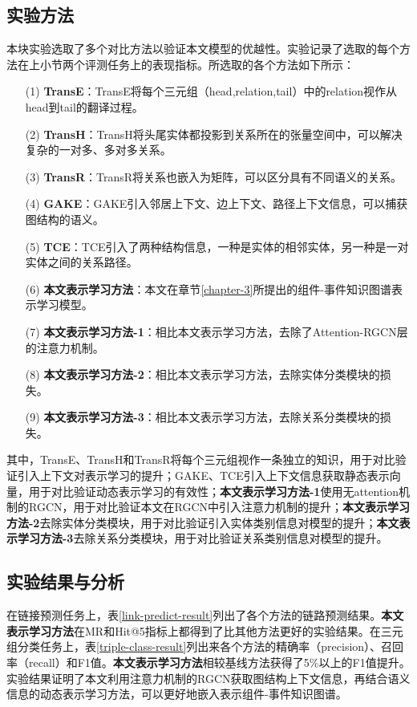 \subsection{实验方法}
本块实验选取了多个对比方法以验证本文模型的优越性。实验记录了选取的每个方法在上小节两个评测任务上的表现指标。所选取的各个方法如下所示：
\begin{itemize}
    \item [(1)] 
    \textbf{TransE}\cite{bordes2013translatingE}：TransE将每个三元组（head,relation,tail）中的relation视作从head到tail的翻译过程。
    \item [(2)]
    \textbf{TransH}\cite{wang2014knowledge}：TransH将头尾实体都投影到关系所在的张量空间中，可以解决复杂的一对多、多对多关系。
    \item [(3)]
    \textbf{TransR}\cite{lin2015learning}：TransR将关系也嵌入为矩阵，可以区分具有不同语义的关系。
    \item [(4)]
    \textbf{GAKE}\cite{feng2016gake}：GAKE引入邻居上下文、边上下文、路径上下文信息，可以捕获图结构的语义。
    \item [(5)]
    \textbf{TCE}\cite{shi2017knowledge}：TCE引入了两种结构信息，一种是实体的相邻实体，另一种是一对实体之间的关系路径。
    \item [(6)]
    \textbf{本文表示学习方法}：本文在章节\ref{chapter-3}所提出的组件-事件知识图谱表示学习模型。
    \item [(7)]
    \textbf{本文表示学习方法-1}：相比本文表示学习方法，去除了Attention-RGCN层的注意力机制。
    \item [(8)]
    \textbf{本文表示学习方法-2}：相比本文表示学习方法，去除实体分类模块的损失。
    \item [(9)]
    \textbf{本文表示学习方法-3}：相比本文表示学习方法，去除关系分类模块的损失。
  \end{itemize}

其中，TransE、TransH和TransR将每个三元组视作一条独立的知识，用于对比验证引入上下文对表示学习的提升；GAKE、TCE引入上下文信息获取静态表示向量，用于对比验证动态表示学习的有效性；\textbf{本文表示学习方法-1}使用无attention机制的RGCN，用于对比验证本文在RGCN中引入注意力机制的提升；\textbf{本文表示学习方法-2}去除实体分类模块，用于对比验证引入实体类别信息对模型的提升；\textbf{本文表示学习方法-3}去除关系分类模块，用于对比验证关系类别信息对模型的提升。

\subsection{实验结果与分析}
在链接预测任务上，表\ref{link-predict-result}列出了各个方法的链路预测结果。\textbf{本文表示学习方法}在MR和Hit@5指标上都得到了比其他方法更好的实验结果。在三元组分类任务上，表\ref{triple-class-result}列出来各个方法的精确率（precision）、召回率（recall）和F1值。\textbf{本文表示学习方法}相较基线方法获得了5\%以上的F1值提升。实验结果证明了本文利用注意力机制的RGCN获取图结构上下文信息，再结合语义信息的动态表示学习方法，可以更好地嵌入表示组件-事件知识图谱。

